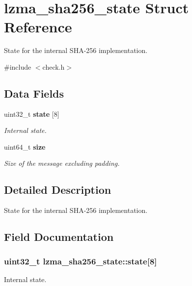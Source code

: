 \section{lzma\-\_\-sha256\-\_\-state Struct Reference}
\label{structlzma__sha256__state}


State for the internal S\-H\-A-\/256 implementation.  




{\ttfamily \#include $<$check.\-h$>$}

\subsection*{Data Fields}
\begin{DoxyCompactItemize}
\item 
uint32\-\_\-t {\bf state} [8]
\begin{DoxyCompactList}\small\item\em Internal state. \end{DoxyCompactList}\item 
uint64\-\_\-t {\bf size}
\begin{DoxyCompactList}\small\item\em Size of the message excluding padding. \end{DoxyCompactList}\end{DoxyCompactItemize}


\subsection{Detailed Description}
State for the internal S\-H\-A-\/256 implementation. 

\subsection{Field Documentation}
\subsubsection[{state}]{\setlength{\rightskip}{0pt plus 5cm}uint32\-\_\-t lzma\-\_\-sha256\-\_\-state\-::state[8]}\label{structlzma__sha256__state_adb885aab736aae3772761f6c663c40be}


Internal state. 



